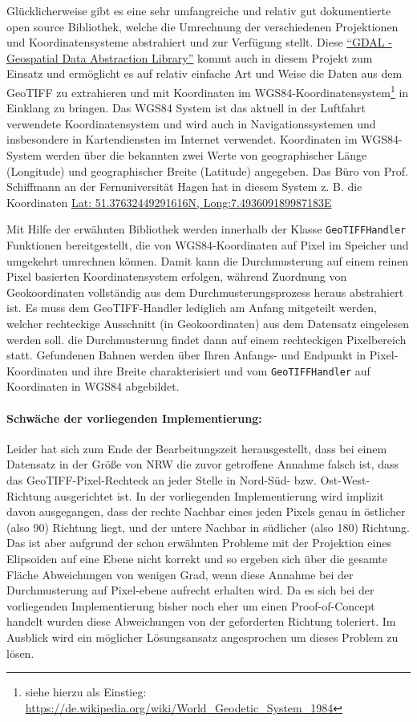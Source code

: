 \documentclass[10pt,a4paper]{report}
\begin{document}
Glücklicherweise gibt es eine sehr umfangreiche und relativ gut dokumentierte open source Bibliothek, welche die Umrechnung der verschiedenen Projektionen und Koordinatensysteme abstrahiert und zur Verfügung stellt. Diese \href{http://www.gdal.org/}{"`GDAL - Geospatial Data Abstraction Library"'} kommt auch in diesem Projekt zum Einsatz und ermöglicht es auf relativ einfache Art und Weise die Daten aus dem GeoTIFF zu extrahieren und mit Koordinaten im WGS84-Koordinatensystem\footnote{siehe hierzu als Einstieg: \href{https://de.wikipedia.org/wiki/World_Geodetic_System_1984}{https://de.wikipedia.org/wiki/World\_Geodetic\_System\_1984}} in Einklang zu bringen. Das WGS84 System ist das aktuell in der Luftfahrt verwendete Koordinatensystem und wird auch in Navigationssystemen und insbesondere in Kartendiensten im Internet verwendet. Koordinaten im WGS84-System werden über die bekannten zwei Werte von geographischer Länge (Longitude) und geographischer Breite (Latitude) angegeben. Das Büro von Prof. Schiffmann an der Fernuniversität Hagen hat in diesem System z. B. die Koordinaten \href{http://bl.ocks.org/d/94faa16e1c8cb9d9226902f9fb0cc36c}{Lat: 51.37632449291616N, Long:7.493609189987183E}

Mit Hilfe der erwähnten Bibliothek werden innerhalb der Klasse \texttt{GeoTIFFHandler} Funktionen bereitgestellt, die von WGS84-Koordinaten auf Pixel im Speicher und umgekehrt umrechnen können. Damit kann die Durchmusterung auf einem reinen Pixel basierten Koordinatensystem erfolgen, während Zuordnung von Geokoordinaten vollständig aus dem Durchmusterungsprozess heraus abstrahiert ist. Es muss dem GeoTIFF-Handler lediglich am Anfang mitgeteilt werden, welcher rechteckige Ausschnitt (in Geokoordinaten) aus dem Datensatz eingelesen werden soll. die Durchmusterung findet dann auf einem rechteckigen Pixelbereich statt. Gefundenen Bahnen werden über Ihren Anfangs- und Endpunkt in Pixel-Koordinaten und ihre Breite charakterisiert und vom \texttt{GeoTIFFHandler} auf Koordinaten in WGS84 abgebildet.

\paragraph{Schwäche der vorliegenden Implementierung:} Leider hat sich zum Ende der Bearbeitungszeit herausgestellt, dass bei einem Datensatz in der Größe von NRW die zuvor getroffene Annahme falsch ist, dass das GeoTIFF-Pixel-Rechteck an jeder Stelle in Nord-Süd- bzw. Ost-West-Richtung ausgerichtet ist. In der vorliegenden Implementierung wird implizit davon ausgegangen, dass der rechte Nachbar eines jeden Pixels genau in östlicher (also 90\degree) Richtung liegt, und der untere Nachbar in südlicher (also 180\degree) Richtung. Das ist aber aufgrund der schon erwähnten Probleme mit der Projektion eines Elipsoiden auf eine Ebene nicht korrekt und so ergeben sich über die gesamte Fläche Abweichungen von wenigen Grad, wenn diese Annahme bei der Durchmusterung auf Pixel-ebene aufrecht erhalten wird. Da es sich bei der vorliegenden Implementierung bisher noch eher um einen Proof-of-Concept handelt wurden diese Abweichungen von der geforderten Richtung toleriert. Im Ausblick wird ein möglicher Lösungsansatz angesprochen um dieses Problem zu lösen.
\end{document}
